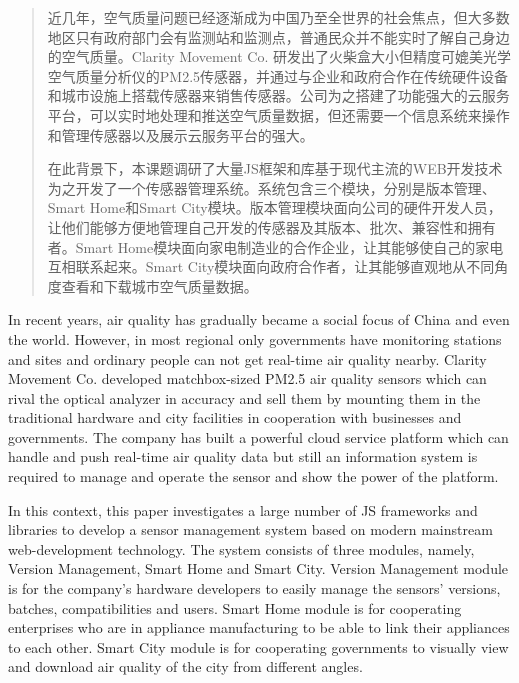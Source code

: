 
\begin{abstract}

近几年，空气质量问题已经逐渐成为中国乃至全世界的社会焦点，但大多数地区只有政府部门会有监测站和监测点，普通民众并不能实时了解自己身边的空气质量。Clarity Movement Co. 研发出了火柴盒大小但精度可媲美光学空气质量分析仪的PM2.5传感器，并通过与企业和政府合作在传统硬件设备和城市设施上搭载传感器来销售传感器。公司为之搭建了功能强大的云服务平台，可以实时地处理和推送空气质量数据，但还需要一个信息系统来操作和管理传感器以及展示云服务平台的强大。

在此背景下，本课题调研了大量JS框架和库基于现代主流的WEB开发技术为之开发了一个传感器管理系统。系统包含三个模块，分别是版本管理、Smart Home和Smart City模块。版本管理模块面向公司的硬件开发人员，让他们能够方便地管理自己开发的传感器及其版本、批次、兼容性和拥有者。Smart Home模块面向家电制造业的合作企业，让其能够使自己的家电互相联系起来。Smart City模块面向政府合作者，让其能够直观地从不同角度查看和下载城市空气质量数据。

\end{abstract}

\begin{englishabstract}

In recent years, air quality has gradually became a social focus of China and even the world. However, in most regional only governments have monitoring stations and sites and ordinary people can not get real-time air quality nearby. Clarity Movement Co. developed matchbox-sized PM2.5 air quality sensors which can rival the optical analyzer in accuracy and sell them by mounting them in the traditional hardware and city facilities in cooperation with businesses and governments. The company has built a powerful cloud service platform which can handle and push real-time air quality data but still an information system is required to manage and operate the sensor and show the power of the platform.

In this context, this paper investigates a large number of JS frameworks and libraries to develop a sensor management system based on modern mainstream web-development technology. The system consists of three modules, namely, Version Management, Smart Home and Smart City. Version Management module is for the company's hardware developers to easily manage the sensors' versions, batches, compatibilities and users. Smart Home module is for cooperating enterprises who are in appliance manufacturing to be able to link their appliances to each other. Smart City module is for cooperating governments to visually view and download air quality of the city from different angles.

\end{englishabstract}

